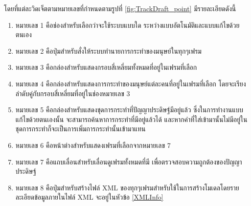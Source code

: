 โดยที่แต่ละวิดเจ็ตตามหมายเลขที่กำหนดตามรูปที่ \ref{fig:TrackDraft_point} มีรายละเอียดดังนี้
\begin{enumerate}
	\setlength\itemsep{-0.25em}
    \item หมายเลข 1 คือช่องสำหรับเลือกว่าจะใช้ระบบแบบใด ระหว่างแบบอัตโนมัติและแบบแก้ไขด้วยตนเอง
    \item หมายเลข 2 คือปุ่มสำหรับสั่งให้ระบบทำนายการกระทำของมนุษย์ในทุกๆเฟรม
    \item หมายเลข 3 คือกล่องสำหรับแสดงกรอบสี่เหลี่ยมทั้งหมดที่อยู่ในเฟรมที่เลือก
	\item หมายเลข 4 คือกล่องสำหรับแสดงการกระทำของมนุษย์แต่ละคนที่อยู่ในเฟรมที่เลือก โดยจะเรียงลำดับคู่กับกรอบสี่เหลี่ยมที่อยู่ในช่องหมายเลข 3
    \item หมายเลข 5 คือกล่องสำหรับแสดงชุดการกระทำที่ปัญญาประดิษฐ์มีอยู่แล้ว ซึ่งในการทำงานแบบแก้ไขด้วยตนเองนั้น จะสามารถค้นหาการกระทำที่มีอยู่แล้วได้ 
    และหากคำที่ใส่เข้ามานั้นไม่มีอยู่ในชุดการกระทำก็จะเป็นการเพิ่มการกระทำนั้นเข้ามาแทน
	\item หมายเลข 6 คือหน้าต่างสำหรับแสดงเฟรมที่เลือกจากหมายเลข 7
	\item หมายเลข 7 คือแถบเลื่อนสำหรับเลื่อนดูเฟรมทั้งหมดที่มี เพื่อตรวจสอบความถูกต้องของปัญญาประดิษฐ์
	\item หมายเลข 8 คือปุ่มสำหรับสร้างไฟล์ XML ของทุกๆเฟรมสำหรับใช้ในการสร้างโมเดลโดยรายละเอียดข้อมูลภายในไฟล์ XML จะอยู่ในหัวข้อ \ref{XMLInfo}
\end{enumerate}
\clearpage

